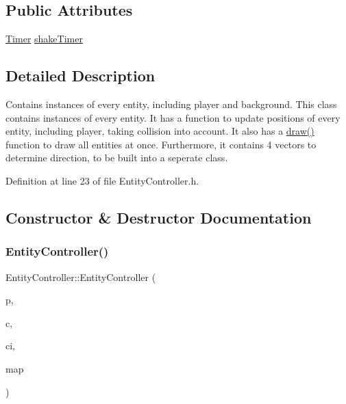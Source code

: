 \subsection*{Public Attributes}
\begin{DoxyCompactItemize}
\item 
\hyperlink{struct_timer}{Timer} \hyperlink{class_entity_controller_a05eb6c6b51a8628079e3c9432319f2b5}{shake\+Timer}
\end{DoxyCompactItemize}


\subsection{Detailed Description}
Contains instances of every entity, including player and background. This class contains instances of every entity. It has a function to update positions of every entity, including player, taking collision into account. It also has a \hyperlink{class_entity_controller_a82e17378b1553449be6f93a8c18eefee}{draw()} function to draw all entities at once. Furthermore, it contains 4 vectors to determine direction, to be built into a seperate class. 

Definition at line 23 of file Entity\+Controller.\+h.



\subsection{Constructor \& Destructor Documentation}
\mbox{\label{class_entity_controller_a2d81c913c30dc661d101c945d67b73b7}} 
\subsubsection{\texorpdfstring{Entity\+Controller()}{EntityController()}}
{\footnotesize\ttfamily Entity\+Controller\+::\+Entity\+Controller (\begin{DoxyParamCaption}\item[{\hyperlink{class_player}{Player} \&}]{p,  }\item[{\hyperlink{class_cursor}{Cursor} \&}]{c,  }\item[{\hyperlink{struct_controls_input}{Controls\+Input} \&}]{ci,  }\item[{\hyperlink{class_map}{Map} $\ast$}]{map }\end{DoxyParamCaption})}



